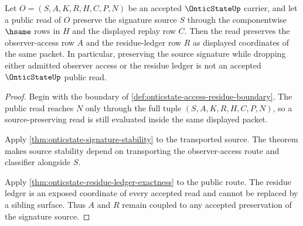 \begin{theorem}
\label{thm:onticstate-access-residue-coupling}
Let $O=(S,A,K,R,H,C,P,N)$ be an accepted $\OnticStateUp$ carrier, and let a public read of $O$ preserve the signature source $S$ through the componentwise $\hsame$ rows in $H$ and the displayed replay row $C$. Then the read preserves the observer-access row $A$ and the residue-ledger row $R$ as displayed coordinates of the same packet. In particular, preserving the source signature while dropping either admitted observer access or the residue ledger is not an accepted $\OnticStateUp$ public read.
\end{theorem}
\begin{proof}
Begin with the boundary of \autoref{def:onticstate-access-residue-boundary}. The public read reaches $N$ only through the full tuple $(S,A,K,R,H,C,P,N)$, so a source-preserving read is still evaluated inside the same displayed packet.

Apply \autoref{thm:onticstate-signature-stability} to the transported source. The theorem makes source stability depend on transporting the observer-access route and classifier alongside $S$.

Apply \autoref{thm:onticstate-residue-ledger-exactness} to the public route. The residue ledger is an exposed coordinate of every accepted read and cannot be replaced by a sibling surface. Thus $A$ and $R$ remain coupled to any accepted preservation of the signature source.
\end{proof}

